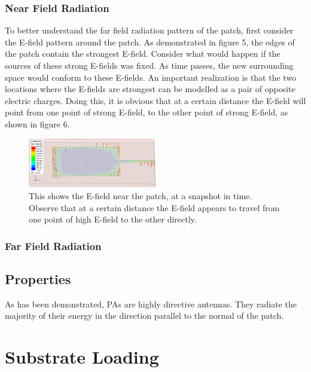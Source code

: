 \documentclass[12pt]{article}
\begin{document}
\subsubsection{Near Field Radiation}

To better understand the far field radiation pattern of the patch, first consider the E-field pattern around the patch. As demonstrated in figure 5, the edges of the patch contain the strongest E-field. Consider what would happen if the sources of these strong E-fields was fixed. As time passes, the new surrounding space would conform to these E-fields. An important realization is that the two locations where the E-fields are strongest can be modelled as a pair of opposite electric charges. Doing this, it is obvious that at a certain distance the E-field will point from one point of strong E-field, to the other point of strong E-field, as shown in figure 6.

\begin{figure}[h]
    \centering
    \includegraphics[width=0.5\textwidth]{basic-patch-antenna-VecE-onPatch-t0.png}
    \caption{This shows the E-field near the patch, at a snapshot in time. Observe that at a certain distance the E-field appears to travel from one point of high E-field to the other directly.}
\end{figure}  

\subsubsection{Far Field Radiation}



\subsection{Properties}

As has been demonstrated, PAs are highly directive antennas. They radiate the majority of their energy in the direction parallel to the normal of the patch. 

\section{Substrate Loading}
\end{document}

